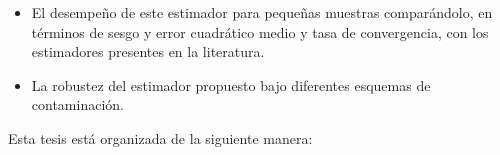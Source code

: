 \begin{itemize}
	\item El desempeño de este estimador para pequeñas muestras comparándolo, en términos de sesgo y error cuadrático medio y tasa de convergencia, con los estimadores presentes en la literatura.
	\item La robustez del estimador propuesto bajo diferentes esquemas de contaminación.
\end{itemize}  

Esta tesis está organizada de la siguiente manera:

